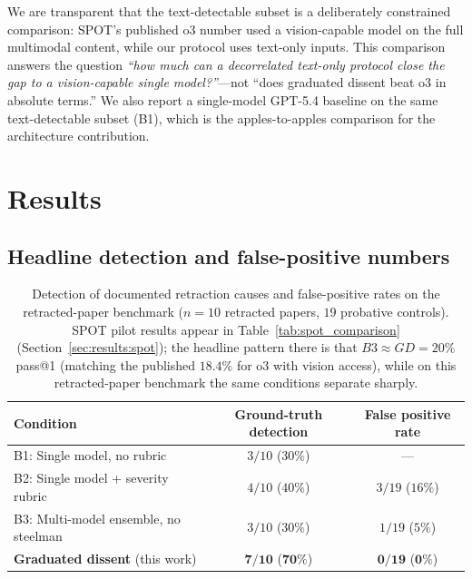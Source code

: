 \documentclass[11pt]{article}
\theoremstyle{definition}
\begin{document}
We are transparent that the text-detectable subset is a deliberately constrained comparison: SPOT's published o3 number used a vision-capable model on the full multimodal content, while our protocol uses text-only inputs. This comparison answers the question \emph{``how much can a decorrelated text-only protocol close the gap to a vision-capable single model?''}---not ``does graduated dissent beat o3 in absolute terms.'' We also report a single-model GPT-5.4 baseline on the same text-detectable subset (B1), which is the apples-to-apples comparison for the architecture contribution.

\section{Results}
\label{sec:results}

\subsection{Headline detection and false-positive numbers}

\begin{table}[ht]
\centering
\caption{Detection of documented retraction causes and false-positive rates on the retracted-paper benchmark ($n=10$ retracted papers, $19$ probative controls). SPOT pilot results appear in Table~\ref{tab:spot_comparison} (Section~\ref{sec:results:spot}); the headline pattern there is that $B3 \approx GD = 20\%$ pass@1 (matching the published $18.4\%$ for o3 with vision access), while on this retracted-paper benchmark the same conditions separate sharply.}
\label{tab:detection_summary}
\small
\begin{tabular}{lcc}
\toprule
\textbf{Condition} & \textbf{Ground-truth detection} & \textbf{False positive rate} \\
\midrule
B1: Single model, no rubric                 & $3/10$ ($30\%$)  & --- \\
B2: Single model + severity rubric          & $4/10$ ($40\%$)  & $3/19$ ($16\%$) \\
B3: Multi-model ensemble, no steelman       & $3/10$ ($30\%$)  & $1/19$ ($5\%$) \\
\textbf{Graduated dissent} (this work)      & $\mathbf{7/10}$ ($\mathbf{70\%}$) & $\mathbf{0/19}$ ($\mathbf{0\%}$) \\
\bottomrule
\end{tabular}
\end{table}
\end{document}
